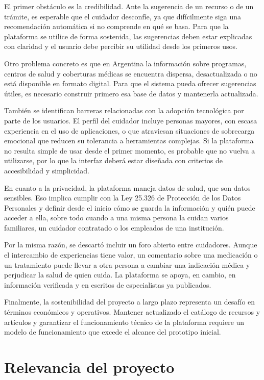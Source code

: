 El primer obstáculo es la credibilidad. Ante la sugerencia de un recurso o de un trámite, es esperable que el cuidador desconfíe, ya que difícilmente siga una recomendación automática si no comprende en qué se basa. Para que la plataforma se utilice de forma sostenida, las sugerencias deben estar explicadas con claridad y el usuario debe percibir su utilidad desde los primeros usos.

Otro problema concreto es que en Argentina la información sobre programas, centros de salud y coberturas médicas se encuentra dispersa, desactualizada o no está disponible en formato digital. Para que el sistema pueda ofrecer sugerencias útiles, es necesario construir primero esa base de datos y mantenerla actualizada.

También se identifican barreras relacionadas con la adopción tecnológica por parte de los usuarios. El perfil del cuidador incluye personas mayores, con escasa experiencia en el uso de aplicaciones, o que atraviesan situaciones de sobrecarga emocional que reducen su tolerancia a herramientas complejas. Si la plataforma no resulta simple de usar desde el primer momento, es probable que no vuelva a utilizarse, por lo que la interfaz deberá estar diseñada con criterios de accesibilidad y simplicidad.

En cuanto a la privacidad, la plataforma maneja datos de salud, que son datos sensibles. Eso implica cumplir con la Ley 25.326 de Protección de los Datos Personales \citep{ley25326} y definir desde el inicio cómo se guarda la información y quién puede acceder a ella, sobre todo cuando a una misma persona la cuidan varios familiares, un cuidador contratado o los empleados de una institución.

Por la misma razón, se descartó incluir un foro abierto entre cuidadores. Aunque el intercambio de experiencias tiene valor, un comentario sobre una medicación o un tratamiento puede llevar a otra persona a cambiar una indicación médica y perjudicar la salud de quien cuida. La plataforma se apoya, en cambio, en información verificada y en escritos de especialistas ya publicados.

Finalmente, la sostenibilidad del proyecto a largo plazo representa un desafío en términos económicos y operativos. Mantener actualizado el catálogo de recursos y artículos y garantizar el funcionamiento técnico de la plataforma requiere un modelo de funcionamiento que excede el alcance del prototipo inicial.

\section{Relevancia del proyecto}

